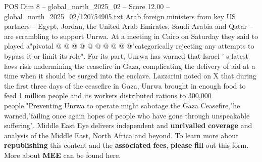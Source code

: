 \begin{textsample}{POS Dim 8 – global\_north\_2025\_02 – Score 12.00 – global\_north\_2025\_02/120754905.txt}
Arab foreign ministers from key US partners -- Egypt, Jordan, the United Arab Emirates, Saudi Arabia and Qatar -- are scrambling to support Unrwa.
At a meeting in Cairo on Saturday they said to played a"pivotal @ @ @ @ @ @ @ @ @ @"categorically rejecting any attempts to bypass it or limit its role".
For its part, Unrwa has warned that Israel ' s latest laws risk undermining the ceasefire in Gaza, complicating the delivery of aid at a time when it should be surged into the enclave.
Lazzarini noted on X that during the first three days of the ceasefire in Gaza, Unrwa brought in enough food to feed 1 million people and its workers distributed rations to 300,000 people."Preventing Unrwa to operate might sabotage the Gaza Ceasefire,"he warned,"failing once again hopes of people who have gone through unspeakable suffering".
Middle East Eye delivers independent and \textbf{unrivalled} \textbf{coverage} and analysis of the Middle East, North Africa and beyond.
To learn more about \textbf{republishing} this content and the \textbf{associated} \textbf{fees}, \textbf{please} \textbf{fill} out this form.
More about \textbf{MEE} can be found here.

\end{textsample}
